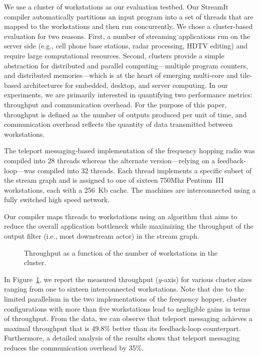 We use a cluster of workstations as our evaluation testbed. Our
StreamIt compiler automatically partitions an input program into a set
of threads that are mapped to the workstations and then run concurrently.
We chose a cluster-based evaluation for two reasons. 
First, a number of streaming applications run on the server side
(e.g., cell phone base stations, radar processing, HDTV editing) and
require large computational resources. Second, clusters provide a
simple abstraction for distributed and parallel computing---multiple program
counters, and distributed memories---which 
is at the heart of emerging multi-core and tile-based architectures
for embedded, desktop, and server computing.
In our experiments, we are primarily interested in quantifying two
performance metrics: throughput and communication overhead.
For the purpose of this paper, throughput is defined
as the number of outputs produced per unit of time, and communication
overhead reflects the quantity of data transmitted between
workstations.

The teleport messaging-based implementation of the frequency hopping
radio was compiled into 28 threads
whereas the alternate version---relying on a feedback-loop---was
compiled into 32 threads.  Each thread implements a
specific subset of the stream graph  and is assigned to one of
sixteen 750Mhz Pentium~III workstations, each with a
256~Kb cache.  The machines are interconnected using a fully switched
high speed network.

Our compiler maps threads to workstations using an algorithm that aims
to reduce the overall application bottleneck while
maximizing the throughput of the output filter (i.e., most downstream
actor) in the stream graph.

\begin{figure}[t]
\caption{\small Throughput as a function of the number of workstations
in the cluster. 
\protect\label{fig:fhr-throughput}}
\end{figure}

In Figure~\ref{fig:fhr-throughput}, we report the measured throughput 
($y$-axis) for various cluster sizes ranging from one to sixteen
interconnected workstations. Note that due to the limited parallelism in the
two implementations of the frequency hopper, cluster configurations
with more than five workstations lead to negligible gains in
terms of throughput. From the data, we can observe that teleport
messaging achieves a maximal throughput that is 49.8\% better than its
feedback-loop counterpart. Furthermore, a detailed analysis of the
results shows that teleport messaging reduces the communication
overhead by 35\%.

